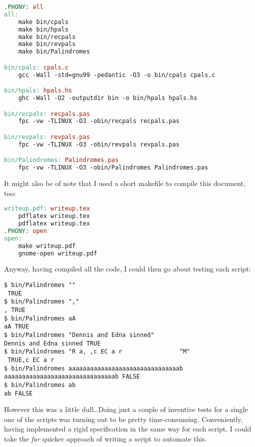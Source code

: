 \documentclass{article}
\begin{document}
\begin{lstlisting}[language=make, caption=Makefile for programs]
.PHONY: all
all:
	make bin/cpals
	make bin/hpals
	make bin/recpals
	make bin/revpals
	make bin/Palindromes

bin/cpals: cpals.c
	gcc -Wall -std=gnu99 -pedantic -O3 -o bin/cpals cpals.c

bin/hpals: hpals.hs
	ghc -Wall -O2 -outputdir bin -o bin/hpals hpals.hs

bin/recpals: recpals.pas
	fpc -vw -TLINUX -O3 -obin/recpals recpals.pas

bin/revpals: revpals.pas
	fpc -vw -TLINUX -O3 -obin/revpals revpals.pas

bin/Palindromes: Palindromes.pas
	fpc -vw -TLINUX -O3 -obin/Palindromes Palindromes.pas
\end{lstlisting}

    It might also be of note that I used a short makefile to compile this
    document, too:

\begin{lstlisting}[language=make, caption=\LaTeX{} makefile]
writeup.pdf: writeup.tex
	pdflatex writeup.tex
	pdflatex writeup.tex
.PHONY: open
open:
	make writeup.pdf
	gnome-open writeup.pdf
\end{lstlisting}

    Anyway, having compiled all the code, I could then go about testing each
    script:

\begin{lstlisting}[caption=Initial testing]
$ bin/Palindromes ""
 TRUE
$ bin/Palindromes ","
, TRUE
$ bin/Palindromes aA 
aA TRUE
$ bin/Palindromes "Dennis and Edna sinned"
Dennis and Edna sinned TRUE
$ bin/Palindromes "R a, ,c EC a r                ^M"
 TRUE,c EC a r                
$ bin/Palindromes aaaaaaaaaaaaaaaaaaaaaaaaaaaaaaab
aaaaaaaaaaaaaaaaaaaaaaaaaaaaaaab FALSE
$ bin/Palindromes ab                              
ab FALSE
\end{lstlisting}

\iffalse $ \fi %

    However this was a little dull\ldots Doing just a couple of inventive tests
    for a single one of the scripts was turning out to be pretty
    time-consuming. Conveniently, having implemented a rigid specification in
    the same way for each script, I could take the \textit{far} quicker
    approach of writing a script to automate this.
\end{document}
